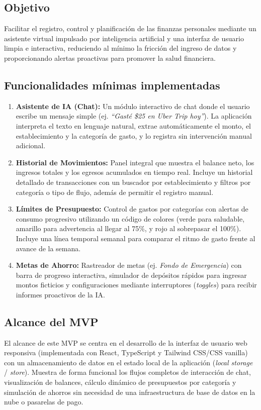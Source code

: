 \documentclass[12pt]{article}
\begin{document}
\subsection{Objetivo}
Facilitar el registro, control y planificación de las finanzas personales mediante un asistente virtual impulsado por inteligencia artificial y una interfaz de usuario limpia e interactiva, reduciendo al mínimo la fricción del ingreso de datos y proporcionando alertas proactivas para promover la salud financiera.

\subsection{Funcionalidades mínimas implementadas}
\begin{enumerate}
    \item \textbf{Asistente de IA (Chat):} Un módulo interactivo de chat donde el usuario escribe un mensaje simple (ej. \textit{``Gasté \$25 en Uber Trip hoy''}). La aplicación interpreta el texto en lenguaje natural, extrae automáticamente el monto, el establecimiento y la categoría de gasto, y lo registra sin intervención manual adicional.
    \item \textbf{Historial de Movimientos:} Panel integral que muestra el balance neto, los ingresos totales y los egresos acumulados en tiempo real. Incluye un historial detallado de transacciones con un buscador por establecimiento y filtros por categoría o tipo de flujo, además de permitir el registro manual.
    \item \textbf{Límites de Presupuesto:} Control de gastos por categorías con alertas de consumo progresivo utilizando un código de colores (verde para saludable, amarillo para advertencia al llegar al 75\%, y rojo al sobrepasar el 100\%). Incluye una línea temporal semanal para comparar el ritmo de gasto frente al avance de la semana.
    \item \textbf{Metas de Ahorro:} Rastreador de metas (ej. \textit{Fondo de Emergencia}) con barra de progreso interactiva, simulador de depósitos rápidos para ingresar montos ficticios y configuraciones mediante interruptores (\textit{toggles}) para recibir informes proactivos de la IA.
\end{enumerate}

\subsection{Alcance del MVP}
El alcance de este MVP se centra en el desarrollo de la interfaz de usuario web responsiva (implementada con React, TypeScript y Tailwind CSS/CSS vanilla) con un almacenamiento de datos en el estado local de la aplicación (\textit{local storage} / \textit{store}). Muestra de forma funcional los flujos completos de interacción de chat, visualización de balances, cálculo dinámico de presupuestos por categoría y simulación de ahorros sin necesidad de una infraestructura de base de datos en la nube o pasarelas de pago.
\end{document}
